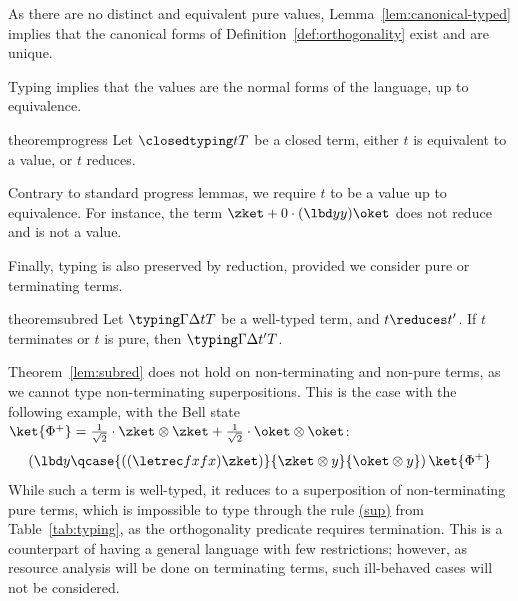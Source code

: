 As there are no distinct and equivalent pure values,
Lemma~\ref{lem:canonical-typed} implies that the canonical forms of
Definition~\ref{def:orthogonality} exist and are unique.

Typing implies that the values are the normal forms
of the language, up to equivalence.

\begin{restatable}[Progress]{theorem}{progress}
  \label{lem:progress}
  Let $\closedtyping t T$ be a closed term, either $t$ is equivalent
  to a value, or $t$ reduces.
\end{restatable}

Contrary to standard progress lemmas, we require $t$ to be a value up to
equivalence. For instance, the term $\zket + 0 \cdot (\lbd y y) \oket$ does not 
reduce and is not a value.

Finally, typing is also preserved by reduction, provided we consider pure or
terminating terms.

\begin{restatable}{theorem}{subred}
  \label{lem:subred}
  Let $\typing \Gamma \Delta t T$ be a well-typed term, and $t \reduces t'$.
  If $t$ terminates or $t$ is pure,
  then $\typing \Gamma \Delta {t'} T$.
\end{restatable}

\begin{remark}\label{rem:subred}
  Theorem~\ref{lem:subred} does not hold on non-terminating and non-pure
  terms, as we cannot type non-terminating superpositions.
  This is the case with the following example, with the Bell state
  $\ket{\Phi^+} =
  \frac{1}{\sqrt 2} \cdot \zket\otimes \zket
  + \frac{1}{\sqrt 2} \cdot \oket\otimes \oket$:
  \[
    \left(\lbd y \qcase{
        ((\letrec f x fx)\zket)
    }{\zket \otimes y}{\oket \otimes y}\right) \ket{\Phi^+}
  \]
  While such a term is well-typed, it reduces to a superposition of
  non-terminating pure terms, which is impossible to type through the rule
  \hyperlink{typesup}{(sup)} from Table~\ref{tab:typing}, as
  the orthogonality predicate requires termination. This is a counterpart of
  having a general language with few restrictions; however, as resource
  analysis will be done on terminating terms, such ill-behaved cases will not be
  considered.
\end{remark}

